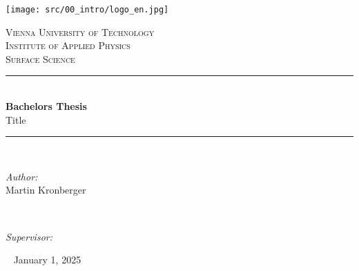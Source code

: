\thispagestyle{empty}

\newcommand{\HRule}{\rule{\linewidth}{0.5mm}} %

\texttt{[image: src/00\_intro/logo\_en.jpg]}
\vspace{3cm}

\begin{center} %

\textsc{\LARGE Vienna University of Technology}\\[1cm] 
\textsc{\Large Institute of Applied Physics}\\[1cm]
\textsc{\large Surface Science}\\[3cm]

\HRule \\[0.4cm]
{\Huge \bfseries Bachelors Thesis}\\[0.5cm] %
{\Large Title}
\HRule \\[2cm]


\begin{minipage}{0.4\textwidth}
\begin{flushleft} \large
	\emph{Author:}\\
	Martin Kronberger\\
	\end{flushleft}
	\end{minipage}
~
\begin{minipage}{0.5\textwidth}
\begin{flushright} \large
	\emph{Supervisor:} \\
\end{flushright}
\end{minipage}\
\vspace{1cm}
\makeatletter
\vspace{1cm}
{\large January 1, 2025}
\end{center}

\blankpage
